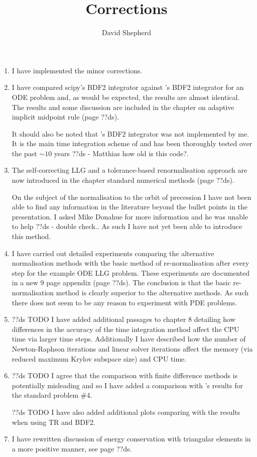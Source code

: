 \documentclass[12pt,a4paper,pdftex]{article}
\title{Corrections}
\author{David Shepherd}
\begin{document}
\maketitle

\begin{enumerate}
\item I have implemented the minor corrections.

\item I have compared scipy's \VODE BDF2 integrator against \oomph's BDF2 integrator for an ODE problem and, as would be expected, the results are almost identical. The results and some discussion are included in the chapter on adaptive implicit midpoint rule (page ??ds).

It should also be noted that \oomph's BDF2 integrator was not implemented by me.
It is the main time integration scheme of \oomph and has been thoroughly tested over the past $\sim 10$ years ??ds - Matthias how old is this code?.

\item The self-correcting LLG and a tolerance-based renormalisation approach are now introduced in the chapter standard numerical methods (page ??ds).

  On the subject of the normalisation to the orbit of precession I have not been able to find any information in the literature beyond the bullet points in the presentation.
I asked Mike Donahue for more information and he was unable to help ??ds - double check..
As such I have not yet been able to introduce this method.

\item I have carried out detailed experiments comparing the alternative normalisation methods with the basic method of re-normalisation after every step for the example ODE LLG problem.
These experiments are documented in a new 9 page appendix (page ??ds).
The conclusion is that the basic re-normalisation method is clearly superior to the alternative methods.
As such there does not seem to be any reason to experiment with PDE problems.

\item ??ds TODO
  I have added additional passages to chapter 8 detailing how differences in the accuracy of the time integration method affect the CPU time via larger time steps.
  Additionally I have described how the number of Newton-Raphson iterations and linear solver iterations affect the memory (via reduced maximum Krylov subspace size) and CPU time.

\item ??ds TODO
I agree that the comparison with finite difference methods is potentially misleading and so I have added a comparison with \nmag's results for the \mumag standard problem \#4.

??ds TODO
I have also added additional plots comparing with the results when using TR and BDF2.

\item I have rewritten discussion of energy conservation with triangular elements in a more positive manner, see page ??ds.

\end{enumerate}
\end{document}
